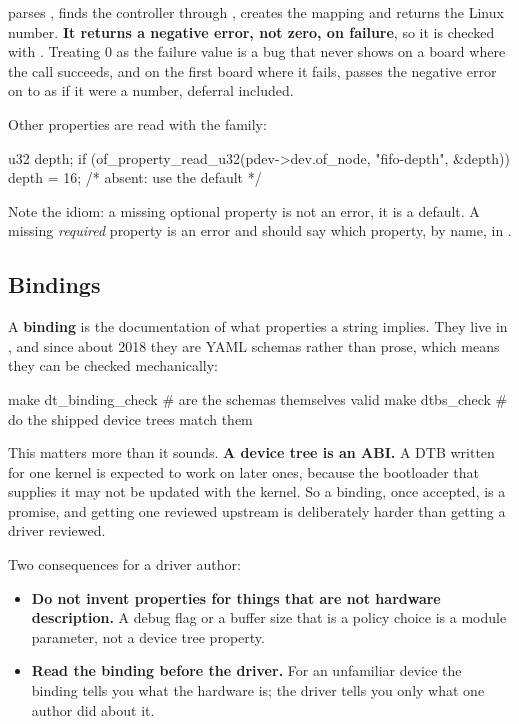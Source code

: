  parses , finds the controller through
, creates the mapping and returns the Linux number. \textbf{It returns a
negative error, not zero, on failure}, so it is checked with . Treating 0 as the failure
value is a bug that never shows on a board where the call succeeds, and on the first board where it
fails, passes the negative error on to  as if it were a number, deferral
included.

Other properties are read with the  family:

\begin{ccode}
u32 depth;
if (of_property_read_u32(pdev->dev.of_node, "fifo-depth", &depth))
        depth = 16;                     /* absent: use the default */
\end{ccode}

\noindent Note the idiom: a missing optional property is not an error, it is a default. A missing
\emph{required} property is an error and should say which property, by name, in .

\subsection{Bindings}
\label{c10:app:b7}

A \textbf{binding} is the documentation of what properties a  string implies. They
live in , and since about 2018 they are YAML schemas rather
than prose, which means they can be checked mechanically:

\begin{shell}
make dt_binding_check          # are the schemas themselves valid
make dtbs_check                # do the shipped device trees match them
\end{shell}

\noindent This matters more than it sounds. \textbf{A device tree is an ABI.} A DTB written for one
kernel is expected to work on later ones, because the bootloader that supplies it may not be updated
with the kernel. So a binding, once accepted, is a promise, and getting one reviewed upstream is
deliberately harder than getting a driver reviewed.

Two consequences for a driver author:
\begin{itemize}
  \item \textbf{Do not invent properties for things that are not hardware description.} A debug flag
    or a buffer size that is a policy choice is a module parameter, not a device tree property.
  \item \textbf{Read the binding before the driver.} For an unfamiliar device the binding tells you
    what the hardware is; the driver tells you only what one author did about it.
\end{itemize}

